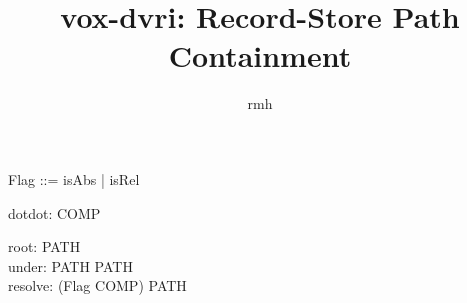 \documentclass{article}
\begin{document}
\title{vox-dvri: Record-Store Path Containment}
\author{rmh}
\maketitle


\begin{zed}
\end{zed}

\begin{zed}
  Flag ::= isAbs | isRel
\end{zed}

\begin{axdef}
  dotdot: COMP
\end{axdef}

\begin{axdef}
  root: PATH \\
  under: PATH \rel PATH \\
  resolve: (Flag \cross \seq COMP) \pfun PATH
\end{axdef}
\end{document}
